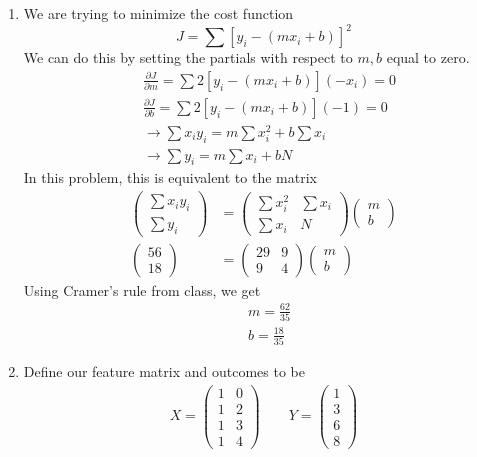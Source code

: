 \documentclass[12pt,letterpaper]{hmcpset}
\begin{document}
\begin{solution}
\begin{enumerate}
   \item 
   We are trying to minimize the cost function
   $$
   J = \sum[y_i - (mx_i + b)]^2
   $$
   We can do this by setting the partials with respect to $m,b$ equal to zero.
   \begin{align*}
       &\frac{\partial J}{\partial m} = \sum 2[y_i - (mx_i + b)](-x_i) = 0 \\
       &\frac{\partial J}{\partial b} = \sum 2[y_i - (mx_i + b)](-1) = 0 \\
       & \rightarrow \sum x_i y_i = m\sum x_i^2 + b\sum x_i\\
       & \rightarrow \sum y_i = m\sum x_i + bN
   \end{align*}
   In this problem, this is equivalent to the matrix
   \begin{align*}
       \begin{pmatrix} \sum x_i y_i \\ \sum y_i\end{pmatrix} &= \begin{pmatrix} \sum x_i^2 & \sum x_i \\ \sum x_i & N \end{pmatrix} \begin{pmatrix} m \\ b\end{pmatrix} \\
       \begin{pmatrix} 56 \\ 18\end{pmatrix} &= \begin{pmatrix} 29 & 9 \\ 9 & 4 \end{pmatrix} \begin{pmatrix} m \\ b\end{pmatrix}
   \end{align*}
   Using Cramer's rule from class, we get
   \begin{align*}
       &m = \frac{62}{35} \\
       &b = \frac{18}{35}
   \end{align*}
    \item 
    Define our feature matrix and outcomes to be
    \begin{align*}
        X = \begin{pmatrix} 1 & 0 \\ 1 & 2 \\1 & 3 \\ 1 & 4 \end{pmatrix} \qquad Y = \begin{pmatrix} 1 \\ 3 \\ 6 \\ 8 \end{pmatrix}

\end{align*}
\end{enumerate}
\end{solution}
\end{document}
